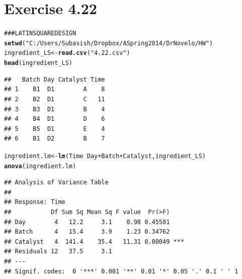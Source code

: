 \documentclass[a4paper]{article}\usepackage{graphicx, color}
\makeatletter
\newcommand{\hlfunctioncall}[1]{\textcolor[rgb]{0.501960784313725,0,0.329411764705882}{\textbf{#1}}}%
\newcommand{\hlstring}[1]{\textcolor[rgb]{0.6,0.6,1}{#1}}%
\newcommand{\hlcomment}[1]{\textcolor[rgb]{0.180392156862745,0.6,0.341176470588235}{#1}}%
\newenvironment{kframe}{%
 \def\at@end@of@kframe{}%
 \ifinner\ifhmode%
  \def\at@end@of@kframe{\end{minipage}}%
  \begin{minipage}{\columnwidth}%
 \fi\fi%
 \def\FrameCommand##1{\hskip\@totalleftmargin \hskip-\fboxsep
 \colorbox{shadecolor}{##1}\hskip-\fboxsep
     \hskip-\linewidth \hskip-\@totalleftmargin \hskip\columnwidth}%
 \MakeFramed {\advance\hsize-\width
   \@totalleftmargin\z@ \linewidth\hsize
   \@setminipage}}%
 {\par\unskip\endMakeFramed%
 \at@end@of@kframe}
\newenvironment{knitrout}{}{} %
\makeatother
\begin{document}
\section{ Exercise 4.22}

\begin{knitrout}
\color{fgcolor}\begin{kframe}
\begin{alltt}
\hlcomment{### LATIN SQUARE DESIGN}
\hlfunctioncall{setwd}(\hlstring{"C:/Users/Subasish/Dropbox/A Spring 2014/Dr Novelo/HW"})
ingredient_LS <- \hlfunctioncall{read.csv}(\hlstring{"4.22.csv"})
\hlfunctioncall{head}(ingredient_LS)
\end{alltt}
\begin{verbatim}
##   Batch Day Catalyst Time
## 1    B1  D1        A    8
## 2    B2  D1        C   11
## 3    B3  D1        B    4
## 4    B4  D1        D    6
## 5    B5  D1        E    4
## 6    B1  D2        B    7
\end{verbatim}
\begin{alltt}

ingredient.lm <- \hlfunctioncall{lm}(Time ~ Day + Batch + Catalyst, ingredient_LS)
\hlfunctioncall{anova}(ingredient.lm)
\end{alltt}
\begin{verbatim}
## Analysis of Variance Table
## 
## Response: Time
##           Df Sum Sq Mean Sq F value  Pr(>F)    
## Day        4   12.2     3.1    0.98 0.45501    
## Batch      4   15.4     3.9    1.23 0.34762    
## Catalyst   4  141.4    35.4   11.31 0.00049 ***
## Residuals 12   37.5     3.1                    
## ---
## Signif. codes:  0 '***' 0.001 '**' 0.01 '*' 0.05 '.' 0.1 ' ' 1
\end{verbatim}
\begin{alltt}


\end{alltt}
\end{kframe}
\end{knitrout}
\end{document}
